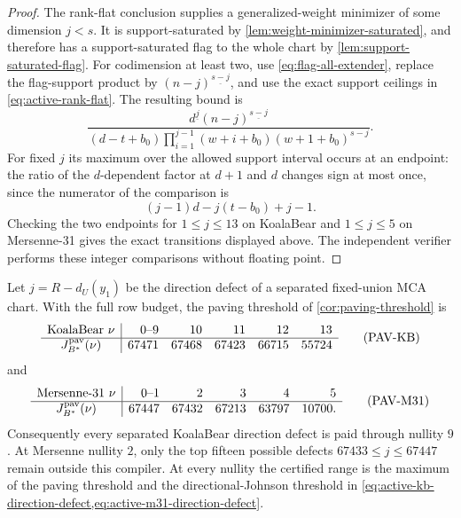 \documentclass[11pt,a4paper]{amsart}
\numberwithin{equation}{section}
\theoremstyle{remark}
\begin{document}
\begin{proof}
The rank-flat conclusion supplies a generalized-weight minimizer of some
dimension $j<s$.  It is support-saturated by
\cref{lem:weight-minimizer-saturated}, and therefore has a
support-saturated flag to the whole chart by
\cref{lem:support-saturated-flag}.  For codimension at least two, use
\eqref{eq:flag-all-extender}, replace the flag-support product by
$(n-j)^{\underline{s-j}}$, and use the exact support ceilings in
\eqref{eq:active-rank-flat}.  The resulting bound is
\[
 \frac{d^{\underline j}(n-j)^{\underline{s-j}}}
 {(d-t+b_0)
  \prod_{i=1}^{j-1}(w+i+b_0)
  (w+1+b_0)^{s-j}}.
\]
For fixed $j$ its maximum over the allowed support interval occurs at an
endpoint: the ratio of the $d$-dependent factor at $d+1$ and $d$ changes
sign at most once, since the numerator of the comparison is
\[
 (j-1)d-j(t-b_0)+j-1.
\]
Checking the two endpoints for $1\le j\le13$ on KoalaBear and
$1\le j\le5$ on Mersenne-31 gives the exact transitions displayed above.
The independent verifier performs these integer comparisons without
floating point.
\end{proof}


\begin{proposition}
\label{prop:active-paving-payments}
Let \(j=R-d_U(y_1)\) be the direction defect of a separated fixed-union
MCA chart.  With the full row budget, the paving threshold of
\cref{cor:paving-threshold} is
\[
\begin{array}{c|rrrrr}
\text{KoalaBear }\nu&0\text{--}9&10&11&12&13\\ \hline
J_{B^*}^{\rm pav}(\nu)&67471&67468&67423&66715&55724
\end{array}
\tag{PAV-KB}\label{eq:active-paving-kb}
\]
and
\[
\begin{array}{c|rrrrr}
\text{Mersenne-31 }\nu&0\text{--}1&2&3&4&5\\ \hline
J_{B^*}^{\rm pav}(\nu)&67447&67432&67213&63797&10700.
\end{array}
\tag{PAV-M31}\label{eq:active-paving-m31}
\]
Consequently every separated KoalaBear direction defect is paid through
nullity \(9\).  At Mersenne nullity \(2\), only the top fifteen possible
defects \(67433\le j\le67447\) remain outside this compiler.  At every
nullity the certified range is the maximum of the paving threshold and the
directional-Johnson threshold in
\cref{eq:active-kb-direction-defect,eq:active-m31-direction-defect}.
\end{proposition}
\end{document}
